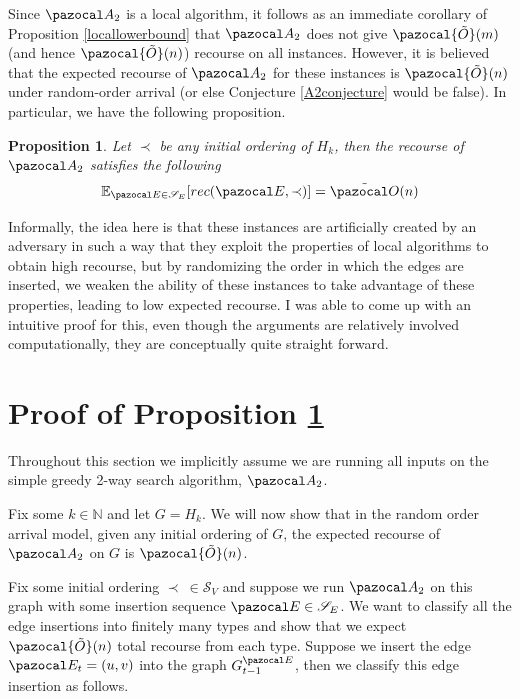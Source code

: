 \documentclass{report}
\newtheorem{proposition}[theorem]{Proposition}
\begin{document}
Since $\pazocal A_2$ is a local algorithm, it follows as an immediate corollary of Proposition \ref{locallowerbound} that $\pazocal A_2$ does not give $\pazocal{\tilde{O}}(m)$ (and hence $\pazocal{\tilde{O}}(n)$) recourse on all instances. However, it is believed that the expected recourse of $\pazocal A_2$ for these instances is $\pazocal{\tilde{O}}(n)$ under random-order arrival (or else Conjecture \ref{A2conjecture} would be false). In particular, we have the following proposition.

\begin{proposition}\label{randomorderbreakdown}
Let $\prec$ be any initial ordering of $H_k$, then the recourse of $\pazocal A_2$ satisfies the following
\[ \mathbb E_{\pazocal E \in \mathcal S_E}[rec(\pazocal E, \prec)] = \tilde{\pazocal O}(n) \]
\end{proposition}

Informally, the idea here is that these instances are artificially created by an adversary in such a way that they exploit the properties of local algorithms to obtain high recourse, but by randomizing the order in which the edges are inserted, we weaken the ability of these instances to take advantage of these properties, leading to low expected recourse. I was able to come up with an intuitive proof for this, even though the arguments are relatively involved computationally, they are conceptually quite straight forward.


\section{Proof of Proposition \ref{randomorderbreakdown}}

Throughout this section we implicitly assume we are running all inputs on the simple greedy 2-way search algorithm, $\pazocal A_2$.

Fix some $k \in \mathbb N$ and let $G=H_k$. We will now show that in the random order arrival model, given any initial ordering of $G$, the expected recourse of $\pazocal A_2$ on $G$ is $\pazocal {\tilde O}(n)$.

Fix some initial ordering $\prec \: \in \mathcal S_V$ and suppose we run $\pazocal A_2$ on this graph with some insertion sequence $\pazocal E \in \mathcal S_E$. We want to classify all the edge insertions into finitely many types and show that we expect $\pazocal{\tilde{O}}(n)$ total recourse from each type. Suppose we insert the edge $\pazocal E_t=(u,v)$ into the graph $G_{t-1}^{\pazocal E}$, then we classify this edge insertion as follows.
\end{document}
